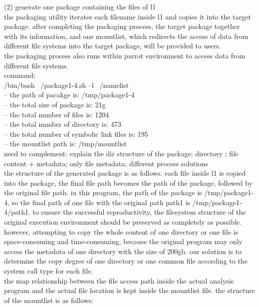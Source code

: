 \documentclass{article}
\begin{document}
(2) generate one package containing the files of l1 \\
the packaging utility iterates each filename inside l1 and copies it into the target package. after completing the packaging process, the target package together with its information, and one mountlist, which redirects the access of data from different file systems into the target package, will be provided to users.\\
the packaging process also runs within parrot environment to access data from different file systems.\\
command:\\
/bin/bash ~/package1-4.sh –l ~/namelist\\
– the path of pacakge is: /tmp/package1-4\\
– the total size of package is: 21g\\
– the total number of files is: 1204\\
– the total number of directory is: 473\\
– the total number of symbolic link files is: 195\\
– the mountlist path is: /tmp/mountlist\\

need to complement: explain the dir structure of the package:  directory ; file content + metadata; only file metadata; different process solutions\\

the structure of the generated package is as follows. each file inside l1 is copied into the package, the final file path becomes the path of the package, followed by the original file path. in this program, the path of the package is /tmp/package1-4, so the final path of one file with the original path path1 is /tmp/package1-4/path1.
to ensure the successful reproductivity, the filesystem structure of the original execution environment should be preserved as completely as possible. however, attempting to copy the whole content of one directory or one file is space-consuming and time-consuming, because the original program may only access the metadata of one directory with the size of 200gb. our solution is to determine the copy degree of one directory or one common file according to the system call type for each file.\\


the map relationship between the file access path inside the actual analysis program and the actual file location is kept inside the mountlist file. the structure of the mountlist is as follows:\\
\end{document}
